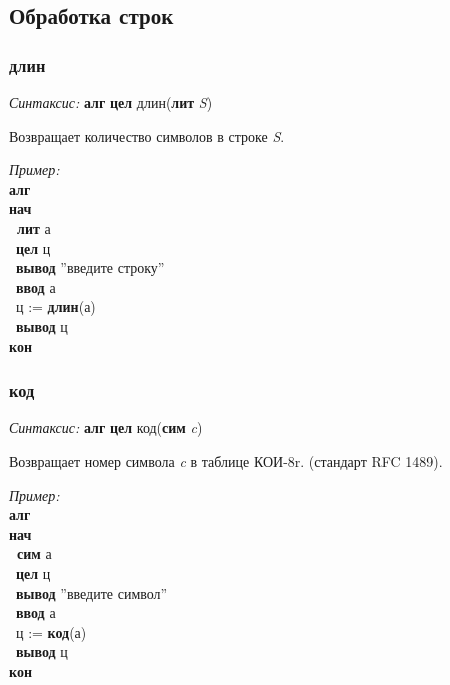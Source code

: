 \documentclass[12pt,a4paper]{article}
\newcommand{\otstup}{\textperiodcentered\ }
\begin{document}
 

\normalfont

\subsection{Обработка строк}

\subsubsection{длин}

\emph{Синтаксис:} \textbf{алг} \textbf{цел} длин(\textbf{лит} \emph{S})


      

		Возвращает количество символов в строке \emph{S}.
      
\emph{Пример:}  
\sffamily
~\\\textbf{алг 
~\\нач
~\\\otstup лит} а
~\\\otstup \textbf{цел} ц
~\\\otstup \textbf{вывод} ''введите строку''
~\\\otstup \textbf{ввод} а
~\\\otstup ц := \textbf{длин}(а)
~\\\otstup \textbf{вывод} ц
~\\\textbf{кон}

\normalfont
\subsubsection{код}

\emph{Синтаксис:} \textbf{алг} \textbf{цел} код(\textbf{сим} \emph{c})


    

      Возвращает номер символа \emph{c}  в таблице КОИ-8r. (стандарт RFC 1489).
      
\emph{Пример:}  
\sffamily
~\\\textbf{алг 
~\\нач
~\\\otstup сим} а
~\\\otstup \textbf{цел} ц
~\\\otstup \textbf{вывод} ''введите символ''
~\\\otstup \textbf{ввод} а
~\\\otstup ц := \textbf{код}(а)
~\\\otstup \textbf{вывод} ц
~\\\textbf{кон}
\end{document}
